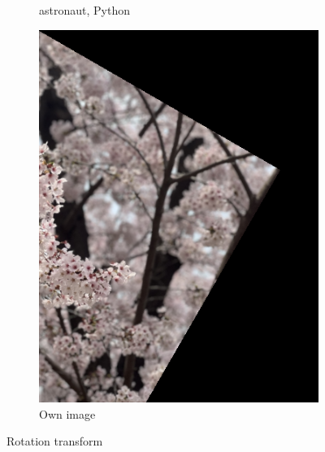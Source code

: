 \documentclass{article}
\begin{document}
\begin{figure}[!ht]
\begin{subfigure}{0.267\textwidth}
        \caption{astronaut, Python}
    \end{subfigure}
    \begin{subfigure}{0.2\textwidth}
        \includegraphics[width=\textwidth]{./fig/rotation_cb.png}
        \caption{Own image}
    \end{subfigure}
    \caption{Rotation transform}
\end{figure}

\newpage
\end{document}
